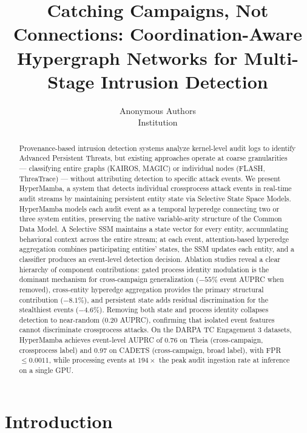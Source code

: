 \documentclass[letterpaper,twocolumn,10pt]{article}
\begin{document}
\date{}

\title{\Large \bf Catching Campaigns, Not Connections: Coordination-Aware Hypergraph Networks for Multi-Stage Intrusion Detection}

\author{
{\rm Anonymous Authors}\\
Institution
}
\maketitle

\begin{abstract}
Provenance-based intrusion detection systems analyze kernel-level audit logs to identify Advanced Persistent Threats, but existing approaches operate at coarse granularities --- classifying entire graphs (KAIROS, MAGIC) or individual nodes (FLASH, ThreaTrace) --- without attributing detection to specific attack events. We present HyperMamba, a system that detects individual crossprocess attack events in real-time audit streams by maintaining persistent entity state via Selective State Space Models. HyperMamba models each audit event as a temporal hyperedge connecting two or three system entities, preserving the native variable-arity structure of the Common Data Model. A Selective SSM maintains a state vector for every entity, accumulating behavioral context across the entire stream; at each event, attention-based hyperedge aggregation combines participating entities' states, the SSM updates each entity, and a classifier produces an event-level detection decision. Ablation studies reveal a clear hierarchy of component contributions: gated process identity modulation is the dominant mechanism for cross-campaign generalization ($-55\%$ event AUPRC when removed), cross-entity hyperedge aggregation provides the primary structural contribution ($-8.1\%$), and persistent state adds residual discrimination for the stealthiest events ($-4.6\%$). Removing both state and process identity collapses detection to near-random ($0.20$ AUPRC), confirming that isolated event features cannot discriminate crossprocess attacks. On the DARPA TC Engagement 3 datasets, HyperMamba achieves event-level AUPRC of 0.76 on Theia (cross-campaign, crossprocess label) and 0.97 on CADETS (cross-campaign, broad label), with FPR $\leq 0.0011$, while processing events at $194\times$ the peak audit ingestion rate at inference on a single GPU.
\end{abstract}

\section{Introduction}
\label{sec:introduction}
\end{document}
